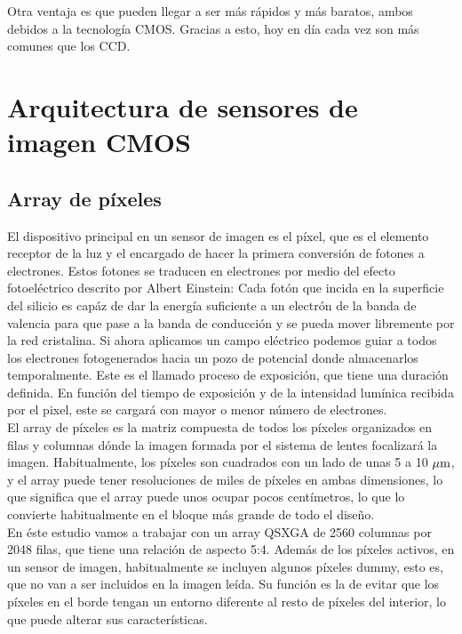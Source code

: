 Otra ventaja es que pueden llegar a ser más rápidos y más baratos, ambos debidos
a la tecnología CMOS. Gracias a esto, hoy en día cada vez son más comunes que los
CCD.\\

\section{Arquitectura de sensores de imagen CMOS}

\subsection{Array de píxeles}\label{cap:pxa_array}

El dispositivo principal en un sensor de imagen es el píxel, que es el elemento
receptor de la luz y el encargado de hacer la primera conversión de fotones a
electrones. Estos fotones se traducen en electrones por medio del efecto fotoeléctrico
descrito por Albert Einstein: Cada fotón que incida en la superficie del silicio
es capáz de dar la energía suficiente a un electrón de la banda de valencia para que
pase a la banda de conducción y se pueda mover libremente por la red cristalina.
Si ahora aplicamos un campo eléctrico podemos guiar a todos los electrones
fotogenerados hacia un pozo de potencial donde almacenarlos temporalmente. Este
es el llamado proceso de exposición, que tiene una duración definida. En función
del tiempo de exposición y de la intensidad lumínica recibida por el pixel, este
se cargará con mayor o menor número de electrones.\\

El array de píxeles es la matriz compuesta de todos los píxeles organizados en filas
y columnas dónde la imagen formada por el sistema de lentes focalizará la imagen.
Habitualmente, los píxeles son cuadrados con un lado de unas 5 a 10 $\mu\text{m}$, y el
array puede tener resoluciones de miles de píxeles en ambas dimensiones, lo que
significa que el array puede unos ocupar pocos centímetros, lo que lo convierte
habitualmente en el bloque más grande de todo el diseño.\\

En éste estudio vamos a trabajar con un array QSXGA de 2560 columnas por 2048 filas,
que tiene una relación de aspecto 5:4. Además de los píxeles activos, en un sensor
de imagen, habitualmente se incluyen algunos píxeles dummy, esto es, que no van
a ser incluidos en la imagen leída. Su función es la de evitar que los píxeles
en el borde tengan un entorno diferente al resto de píxeles del interior, lo que
puede alterar sus características.\\

